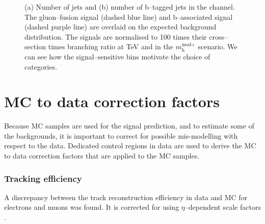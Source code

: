 \begin{figure}[h!]
\begin{center}
\end{center}
\caption{(a) Number of jets and (b) number of b--tagged jets in the \mutau channel. The gluon--fusion signal (dashed
blue line) and b--associated signal (dashed purple line) are overlaid on the expected background distribution. The signals
are normalised to 100 times their cross--section times branching ratio at  TeV and  in the $m_{\text{h}}^{\text{mod+}}$
scenario. We can see how the signal--sensitive bins motivate the choice of categories.}
\label{fig:mssm_cats_mt}
\end{figure}


\section{\ac{MC} to data correction factors}
\label{sec:mssm_mccorrs}
Because \ac{MC} samples are used for the signal prediction, and 
to estimate some of the backgrounds, it is important to correct for possible 
mis-modelling with respect to the data. Dedicated control regions in
data are used to derive the \ac{MC} to data correction factors
that are applied to the \ac{MC} samples.
\subsubsection*{Tracking efficiency}
A discrepancy between the track reconstruction efficiency
in data and \ac{MC} for electrons and muons was found. It is corrected for using $\eta$--dependent
scale factors \cite{CMS-PAS-HIG-16-037}.
